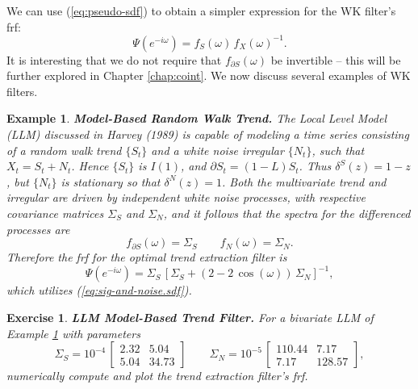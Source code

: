 \documentclass[a4paper]{book}
\newtheorem{Example}{Example}
\newtheorem{Exercise}{Exercise}
\begin{document}
\vspace{.5cm}

 We can use (\ref{eq:pseudo-sdf})   to obtain a simpler expression for the WK filter's frf:
\[
   \Psi (e^{-i \omega}) =    f_{ S} (\omega) \,     { f_{ X} (\omega) }^{-1}.
  \]
  It is interesting that we do not require that $f_{\partial S} (\omega)$ be 
  invertible -- this will be further explored in Chapter \ref{chap:coint}.
  We now discuss several examples of WK filters.

\begin{Example} {\bf Model-Based Random Walk Trend.} \rm
\label{exam:trend-i1}
  The Local Level Model (LLM) discussed in Harvey (1989) is capable
  of modeling a time series consisting
 of a  random walk trend $\{ S_t \}$ and a     white noise irregular
 $\{ N_t \}$, such  that $X_t = S_t + N_t$. 
  Hence $\{ S_t \}$ is $I(1)$, and $\partial S_t = (1-L) S_t$.
  Thus $\delta^S (z) = 1- z$, but $\{ N_t \}$ is stationary so that
  $\delta^N (z) = 1$.  
 Both the multivariate trend and  irregular are driven by independent 
 white noise processes, with respective covariance matrices
   $\Sigma_{S}$ and $\Sigma_{N}$,
  and it follows that the spectra for the differenced processes 
   are
  \[
    f_{\partial S} (\omega) = \Sigma_S \qquad f_{N} (\omega) = \Sigma_N.
\]
  Therefore  the frf for the optimal trend extraction filter is
\[ 
 \Psi (e^{-i \omega}) = \Sigma_{S} \, 
 { \left[ \Sigma_{S} + (2 - 2 \, \cos (\omega)) \, \Sigma_{N} \right] }^{-1},
\]
 which utilizes (\ref{eq:sig-and-noise.sdf}).
 \end{Example}

\begin{Exercise} {\bf LLM Model-Based Trend Filter.} \rm
\label{exer:trend-i1}
 For a bivariate LLM of Example \ref{exer:trend-i1} with parameters 
\[
 \Sigma_{S} = 10^{-4} \,\left[ \begin{array}{ll} 
   2.32  &  5.04  \\
   5.04  & 34.73   \end{array}  \right]
 \qquad  \Sigma_{N} = 10^{-5} \, \left[ \begin{array}{ll}
        110.44   &  7.17  \\
        7.17     & 128.57   \end{array} \right],
\]
 numerically compute and plot the trend extraction filter's frf.
\end{Exercise}
\end{document}
